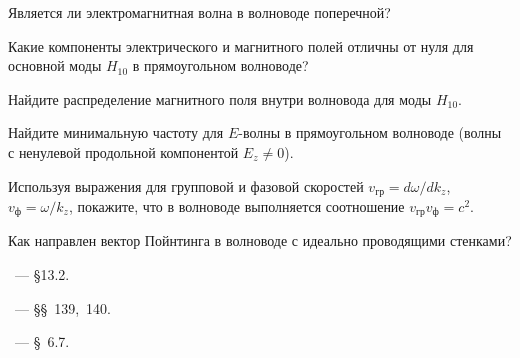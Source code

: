 \begin{lab:questions} 
    
    \item Является ли электромагнитная волна в волноводе поперечной?
    
    \item Какие компоненты электрического и магнитного полей отличны от нуля
для основной моды $H_{10}$ в прямоугольном волноводе?

    \item Найдите распределение магнитного поля внутри волновода для моды $H_{10}$.

    \item Найдите минимальную частоту для $E$-волны в прямоугольном волноводе (волны с ненулевой
    продольной компонентой $E_z\ne 0$).
    
    \item Используя выражения для групповой и фазовой
    скоростей $v_{гр}=d\omega/dk_z$, $v_{\text{ф}}=\omega/k_z$, покажите, что в
    волноводе выполняется соотношение $v_{гр}v_{\text{ф}}=c^2$.
    
    \item Как направлен вектор Пойнтинга в волноводе с идеально проводящими стенками?
\end{lab:questions}


\begin{lab:literature} 
    \item \Kirichenko~--- \S 13.2.
    
    \item \SivuhinIII~--- \S\S~139,~140.
    
    \item \KingLokOlh~--- \S~6.7.
        
\end{lab:literature}